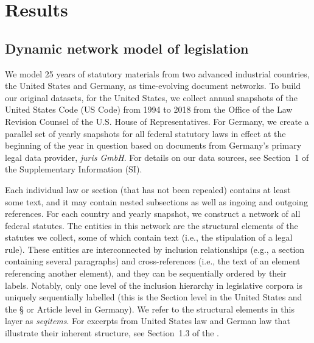 \section{Results}
\label{section:results}

\subsection{Dynamic network model of legislation}\label{subsection:model}
\label{subsection:datamodel}
We model 25 years of statutory materials from two advanced industrial countries, the United States and Germany, as time-evolving document networks. 
To build our original datasets, 
for the United States, we collect annual snapshots of the United States Code (US Code) from 1994 to 2018 from the Office of the Law Revision Counsel of the U.S. House of Representatives.  
For Germany, we create a parallel set of yearly snapshots for all federal statutory laws in effect at the beginning of the year in question based on documents from Germany's primary legal data provider, \emph{juris GmbH}. 
For details on our data sources, see Section~1 of the Supplementary Information (SI). 

Each individual law or section (that has not been repealed) contains at least some text, 
and it may contain nested subsections as well as ingoing and outgoing references.  
For each country and yearly snapshot, we construct a network of all federal statutes. 
The entities in this network are the structural elements of the statutes we collect, some of which contain text (i.e., the stipulation of a legal rule). 
These entities are interconnected by inclusion relationships (e.g., a section containing several paragraphs) and cross-references (i.e., the text of an element referencing another element), 
and they can be sequentially ordered by their labels.
Notably, only one level of the inclusion hierarchy in legislative corpora is uniquely sequentially labelled (this is the Section level in the United States and the § or Article level in Germany). 
We refer to the structural elements in this layer as \emph{seqitems}.
For excerpts from United States law and German law that illustrate their inherent structure, see Section~1.3 of the \suppi. 

